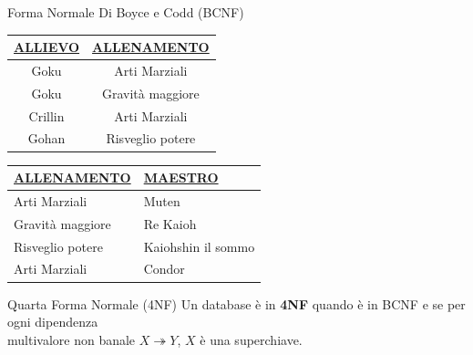 %
\begin{frame}{Forma Normale Di Boyce e Codd (BCNF)}
    
\begin{minipage}[t]{0.45\textwidth}
    \centering
    \begin{tabular}{|c|c|}
        \hline
        \rowcolor{cyan!30} \textbf{\underline{ALLIEVO}} & \textbf{\underline{ALLENAMENTO}} \\ \hline
        Goku & Arti Marziali \\ \hline
        Goku & Gravit\`a maggiore \\ \hline
        Crillin & Arti Marziali \\ \hline
        Gohan & Risveglio potere \\ \hline
    \end{tabular}
\end{minipage}
\hspace{0.8cm}
\begin{minipage}[t]{0.45\textwidth}
    \centering
    \begin{tabular}{| l | l |}
        \hline
        \rowcolor{cyan!30} \textbf{\underline{ALLENAMENTO}} & \textbf{\underline{MAESTRO}} \\ \hline
        Arti Marziali & Muten \\ \hline
        Gravità maggiore & Re Kaioh \\ \hline
        Risveglio potere & Kaiohshin il sommo \\ \hline
        Arti Marziali & Condor \\ \hline
    \end{tabular}
\end{minipage}
\end{frame}
%
\begin{frame}{Quarta Forma Normale (4NF)}
    Un database \`e in \textbf{4NF} quando \`e in BCNF e se per ogni dipendenza \\multivalore non banale $X \twoheadrightarrow Y$, $X$ \`e una superchiave.
\end{frame}
